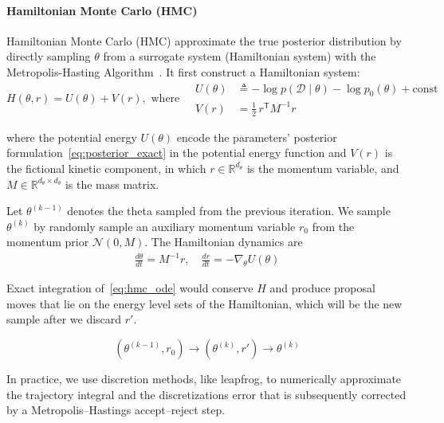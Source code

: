 \documentclass[preprint,12pt]{elsarticle}
\begin{document}
\paragraph{Hamiltonian Monte Carlo (HMC)}
\label{sec:sub:hmc}
Hamiltonian Monte Carlo (HMC) approximate the true posterior distribution by directly sampling $\theta$ from a surrogate system (Hamiltonian system) with the Metropolis-Hasting Algorithm~\cite{neal_mcmc_2012, betancourt_conceptual_2018}. It first construct a Hamiltonian system:
\begin{equation}
\label{eq:hamiltonian_full}
H(\theta,r)=U(\theta)+V(r),
\text{ where}
\quad
\begin{aligned}
    U(\theta)
  &\triangleq -\log p(\mathcal D\mid\theta) - \log p_0(\theta) + \text{const} \\
  V(r)
  &= \tfrac{1}{2}\, r^{\mathsf T} M^{-1} r
\end{aligned}
\end{equation}


\noindent
where the potential energy $U(\theta)$ encode the parameters' posterior formulation~\eqref{eq:posterior_exact} in the potential energy function and $V(r)$ is the fictional kinetic component, in which \( r \in \mathbb{R}^{d_\theta} \) is the momentum variable, and \( M \in \mathbb{R}^{d_\theta \times d_\theta} \) is the mass matrix.

Let $\theta^{(k-1)}$ denotes the theta sampled from the previous iteration. We sample $\theta^{(k)}$ by randomly sample an auxiliary momentum variable $r_0$ from the momentum prior $\mathcal N(0, M)$. The Hamiltonian dynamics are
\begin{subequations}
\label{eq:hmc_ode}
\begin{align}
  \frac{d\theta}{dt} = M^{-1} r, 
  \quad
  \frac{dr}{dt}      = -\nabla_{\!\theta} U(\theta)
\end{align}
\end{subequations}

Exact integration of~\eqref{eq:hmc_ode} would conserve $H$ and produce
proposal moves that lie on the energy level sets of the Hamiltonian, which will be the new sample after we discard $r'$. 

\begin{equation}
    (\theta^{(k-1)}, r_0) \rightarrow (\theta^{(k)}, r') \rightarrow \theta^{(k)}
\end{equation}

\noindent
In practice, we use discretion methods, like leapfrog, to numerically approximate the trajectory integral and the discretizations error that is subsequently corrected by a Metropolis–Hastings accept–reject step. 
\end{document}
